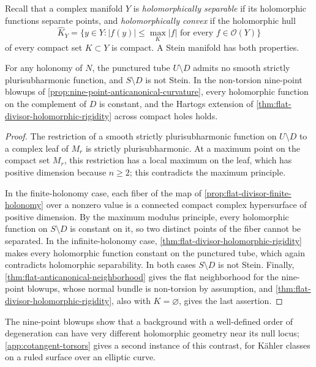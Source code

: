 Recall that a complex manifold $Y$ is \emph{holomorphically separable} if its holomorphic functions separate points, and \emph{holomorphically convex} if the holomorphic hull
\[
 \widehat K_Y=\{y\in Y:|f(y)|\leq\max_K|f|\text{ for every }f\in\mathcal O(Y)\}
\]
of every compact set $K\subset Y$ is compact. A Stein manifold has both properties.

\begin{corollary}\label{cor:flat-divisor-nonstein}
For any holonomy of $N$, the punctured tube $U\setminus D$ admits no smooth strictly plurisubharmonic function, and $S\setminus D$ is not Stein. In the non-torsion nine-point blowups of \cref{prop:nine-point-anticanonical-curvature}, every holomorphic function on the complement of $D$ is constant, and the Hartogs extension of \cref{thm:flat-divisor-holomorphic-rigidity} across compact holes holds.
\end{corollary}
\begin{proof}
The restriction of a smooth strictly plurisubharmonic function on $U\setminus D$ to a complex leaf of $M_r$ is strictly plurisubharmonic. At a maximum point on the compact set $M_r$, this restriction has a local maximum on the leaf, which has positive dimension because $n\geq2$; this contradicts the maximum principle.

In the finite-holonomy case, each fiber of the map of \cref{prop:flat-divisor-finite-holonomy} over a nonzero value is a connected compact complex hypersurface of positive dimension. By the maximum modulus principle, every holomorphic function on $S\setminus D$ is constant on it, so two distinct points of the fiber cannot be separated. In the infinite-holonomy case, \cref{thm:flat-divisor-holomorphic-rigidity} makes every holomorphic function constant on the punctured tube, which again contradicts holomorphic separability. In both cases $S\setminus D$ is not Stein. Finally, \cref{thm:flat-anticanonical-neighborhood} gives the flat neighborhood for the nine-point blowups, whose normal bundle is non-torsion by assumption, and \cref{thm:flat-divisor-holomorphic-rigidity}, also with $K=\varnothing$, gives the last assertion.
\end{proof}

The nine-point blowups show that a background with a well-defined order of degeneration can have very different holomorphic geometry near its null locus; \cref{app:cotangent-torsors} gives a second instance of this contrast, for K\"ahler classes on a ruled surface over an elliptic curve.
